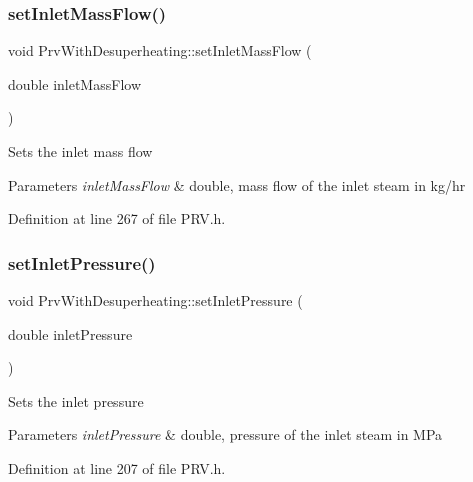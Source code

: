\subsubsection{\texorpdfstring{set\+Inlet\+Mass\+Flow()}{setInletMassFlow()}}
{\footnotesize\ttfamily void Prv\+With\+Desuperheating\+::set\+Inlet\+Mass\+Flow (\begin{DoxyParamCaption}\item[{double}]{inlet\+Mass\+Flow }\end{DoxyParamCaption})\hspace{0.3cm}{\ttfamily [inline]}}

Sets the inlet mass flow


\begin{DoxyParams}{Parameters}
{\em inlet\+Mass\+Flow} & double, mass flow of the inlet steam in kg/hr \\
\hline
\end{DoxyParams}


Definition at line 267 of file P\+R\+V.\+h.

\mbox{\label{class_prv_with_desuperheating_a83da43f7557db22242381e70f743fb7a}} 
\subsubsection{\texorpdfstring{set\+Inlet\+Pressure()}{setInletPressure()}}
{\footnotesize\ttfamily void Prv\+With\+Desuperheating\+::set\+Inlet\+Pressure (\begin{DoxyParamCaption}\item[{double}]{inlet\+Pressure }\end{DoxyParamCaption})\hspace{0.3cm}{\ttfamily [inline]}}

Sets the inlet pressure


\begin{DoxyParams}{Parameters}
{\em inlet\+Pressure} & double, pressure of the inlet steam in M\+Pa \\
\hline
\end{DoxyParams}


Definition at line 207 of file P\+R\+V.\+h.

\mbox{\label{class_prv_with_desuperheating_ab89d8a884a81d1e3b056433dda988800}} 
